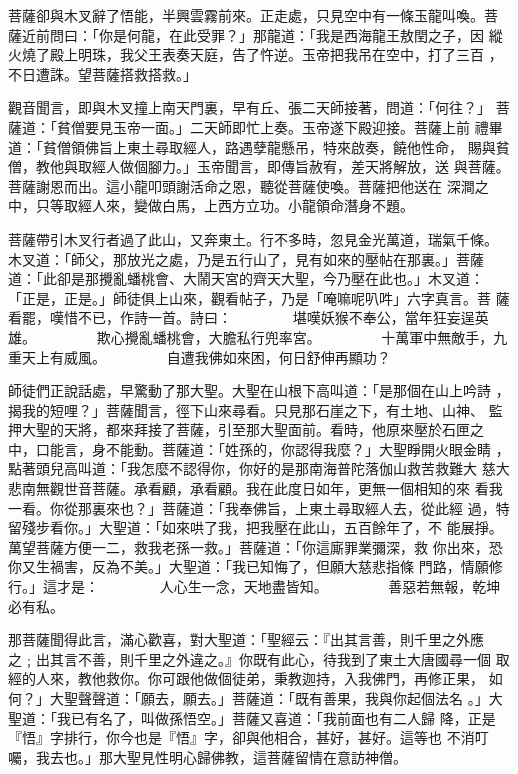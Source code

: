 \begin{pinyinscope}
{菩薩卻與木叉辭了悟能，半興雲霧前來。正走處，只見空中有一條玉龍叫喚。菩
薩近前問曰：「你是何龍，在此受罪？」那龍道：「我是西海龍王敖閏之子，因
縱火燒了殿上明珠，我父王表奏天庭，告了忤逆。玉帝把我吊在空中，打了三百
，不日遭誅。望菩薩搭救搭救。」

觀音聞言，即與木叉撞上南天門裏，早有丘、張二天師接著，問道：「何往？」
菩薩道：「貧僧要見玉帝一面。」二天師即忙上奏。玉帝遂下殿迎接。菩薩上前
禮畢道：「貧僧領佛旨上東土尋取經人，路遇孽龍懸吊，特來啟奏，饒他性命，
賜與貧僧，教他與取經人做個腳力。」玉帝聞言，即傳旨赦宥，差天將解放，送
與菩薩。菩薩謝恩而出。這小龍叩頭謝活命之恩，聽從菩薩使喚。菩薩把他送在
深澗之中，只等取經人來，變做白馬，上西方立功。小龍領命潛身不題。

菩薩帶引木叉行者過了此山，又奔東土。行不多時，忽見金光萬道，瑞氣千條。
木叉道：「師父，那放光之處，乃是五行山了，見有如來的壓帖在那裏。」菩薩
道：「此卻是那攪亂蟠桃會、大鬧天宮的齊天大聖，今乃壓在此也。」木叉道：
「正是，正是。」師徒俱上山來，觀看帖子，乃是「唵嘛呢叭吽」六字真言。菩
薩看罷，嘆惜不已，作詩一首。詩曰：
　　　　堪嘆妖猴不奉公，當年狂妄逞英雄。
　　　　欺心攪亂蟠桃會，大膽私行兜率宮。
　　　　十萬軍中無敵手，九重天上有威風。
　　　　自遭我佛如來困，何日舒伸再顯功？

師徒們正說話處，早驚動了那大聖。大聖在山根下高叫道：「是那個在山上吟詩
，揭我的短哩？」菩薩聞言，徑下山來尋看。只見那石崖之下，有土地、山神、
監押大聖的天將，都來拜接了菩薩，引至那大聖面前。看時，他原來壓於石匣之
中，口能言，身不能動。菩薩道：「姓孫的，你認得我麼？」大聖睜開火眼金睛
，點著頭兒高叫道：「我怎麼不認得你，你好的是那南海普陀落伽山救苦救難大
慈大悲南無觀世音菩薩。承看顧，承看顧。我在此度日如年，更無一個相知的來
看我一看。你從那裏來也？」菩薩道：「我奉佛旨，上東土尋取經人去，從此經
過，特留殘步看你。」大聖道：「如來哄了我，把我壓在此山，五百餘年了，不
能展掙。萬望菩薩方便一二，救我老孫一救。」菩薩道：「你這廝罪業彌深，救
你出來，恐你又生禍害，反為不美。」大聖道：「我已知悔了，但願大慈悲指條
門路，情願修行。」這才是：
　　　　人心生一念，天地盡皆知。
　　　　善惡若無報，乾坤必有私。

那菩薩聞得此言，滿心歡喜，對大聖道：「聖經云：『出其言善，則千里之外應
之﹔出其言不善，則千里之外違之。』你既有此心，待我到了東土大唐國尋一個
取經的人來，教他救你。你可跟他做個徒弟，秉教迦持，入我佛門，再修正果，
如何？」大聖聲聲道：「願去，願去。」菩薩道：「既有善果，我與你起個法名
。」大聖道：「我已有名了，叫做孫悟空。」菩薩又喜道：「我前面也有二人歸
降，正是『悟』字排行，你今也是『悟』字，卻與他相合，甚好，甚好。這等也
不消叮囑，我去也。」那大聖見性明心歸佛教，這菩薩留情在意訪神僧。

}
\end{pinyinscope}
